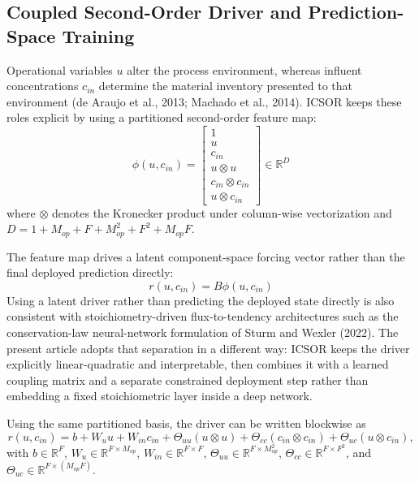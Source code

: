 \documentclass[a4paper,fleqn]{cas-sc}
\newenvironment{revblock}{}{}
\begin{document}
\begin{revblock}
\subsection{Coupled Second-Order Driver and Prediction-Space Training}

Operational variables $u$ alter the process environment, whereas influent concentrations $c_{in}$ determine the material inventory presented to that environment (de Araujo et al., 2013; Machado et al., 2014). ICSOR keeps these roles explicit by using a partitioned second-order feature map:
\begin{equation}
\label{eq:feature-map}
\phi(u, c_{in}) = \begin{bmatrix}
1 \\
 u \\
 c_{in} \\
 u \otimes u \\
 c_{in} \otimes c_{in} \\
 u \otimes c_{in}
\end{bmatrix} \in \mathbb{R}^{D}
\end{equation}
where $\otimes$ denotes the Kronecker product under column-wise vectorization and $D = 1 + M_{op} + F + M_{op}^2 + F^2 + M_{op}F$.

The feature map drives a latent component-space forcing vector rather than the final deployed prediction directly:
\begin{equation}
\label{eq:latent-driver}
 r(u, c_{in}) = B \phi(u, c_{in})
\end{equation}
Using a latent driver rather than predicting the deployed state directly is also consistent with stoichiometry-driven flux-to-tendency architectures such as the conservation-law neural-network formulation of Sturm and Wexler (2022). The present article adopts that separation in a different way: ICSOR keeps the driver explicitly linear-quadratic and interpretable, then combines it with a learned coupling matrix and a separate constrained deployment step rather than embedding a fixed stoichiometric layer inside a deep network.

Using the same partitioned basis, the driver can be written blockwise as
\begin{equation}
\label{eq:blockwise-driver}
 r(u, c_{in}) = b + W_u u + W_{in} c_{in} + \Theta_{uu}(u \otimes u) + \Theta_{cc}(c_{in} \otimes c_{in}) + \Theta_{uc}(u \otimes c_{in}),
\end{equation}
with $b \in \mathbb{R}^{F}$, $W_u \in \mathbb{R}^{F \times M_{op}}$, $W_{in} \in \mathbb{R}^{F \times F}$, $\Theta_{uu} \in \mathbb{R}^{F \times M_{op}^2}$, $\Theta_{cc} \in \mathbb{R}^{F \times F^2}$, and $\Theta_{uc} \in \mathbb{R}^{F \times (M_{op}F)}$.


\end{revblock}
\end{document}
